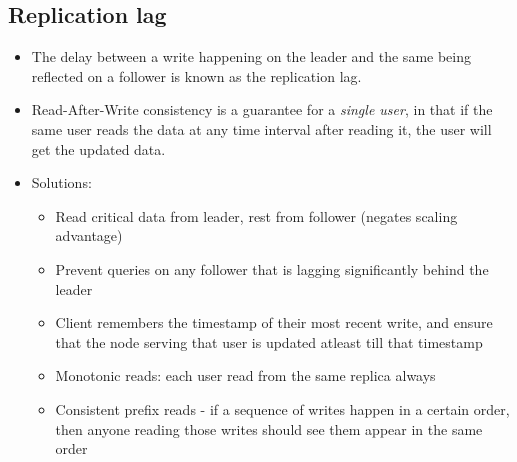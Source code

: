 \documentclass{article}
\begin{document}
\subsection{Replication lag}
\begin{itemize}
    \item The delay between a write happening on the leader and the same being reflected on a follower is known as the replication lag.
    
    \item Read-After-Write consistency is a guarantee for a \textit{single user}, in that if the same user reads the data at any time interval after reading it, the user will get the updated data. 
    
    \item Solutions:
    \begin{itemize}
        \item Read critical data from leader, rest from follower (negates scaling advantage)
        
        \item Prevent queries on any follower that is lagging significantly behind the leader 
        
        \item Client remembers the timestamp of their most recent write, and ensure that the node serving that user is updated atleast till that timestamp
        
        \item Monotonic reads: each user read from the same replica always
        
        \item Consistent prefix reads - if a sequence of writes happen in a certain order, then anyone reading those writes should see them appear in the same order
    \end{itemize}
\end{itemize}
\end{document}
